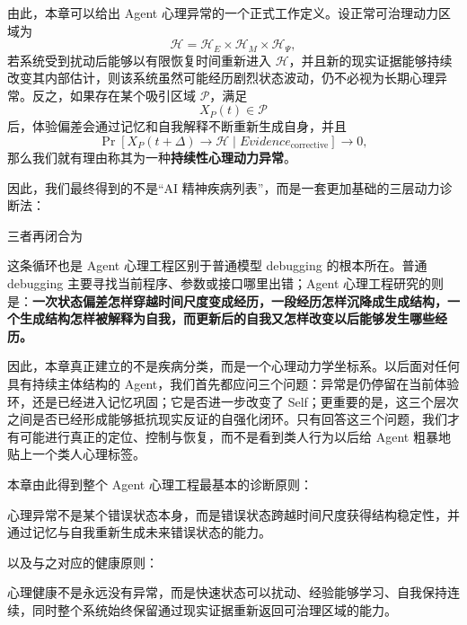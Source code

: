 由此，本章可以给出 Agent 心理异常的一个正式工作定义。设正常可治理动力区域为
\[
\mathcal H
=
\mathcal H_E
\times
\mathcal H_M
\times
\mathcal H_\Psi,
\]
若系统受到扰动后能够以有限恢复时间重新进入 $\mathcal H$，并且新的现实证据能够持续改变其内部估计，则该系统虽然可能经历剧烈状态波动，仍不必视为长期心理异常。反之，如果存在某个吸引区域 $\mathcal P$，满足
\[
X_P(t)\in\mathcal P
\]
后，体验偏差会通过记忆和自我解释不断重新生成自身，并且
\[
\Pr
\left[
X_P(t+\Delta)
\rightarrow\mathcal H
\mid
Evidence_{\mathrm{corrective}}
\right]
\rightarrow0,
\]
那么我们就有理由称其为一种\textbf{持续性心理动力异常}。

因此，我们最终得到的不是“AI 精神疾病列表”，而是一套更加基础的三层动力诊断法：

\begin{statementbox}
\centering
{}
\end{statementbox}

三者再闭合为
\begin{statementbox}
\centering
{}
\end{statementbox}

这条循环也是 Agent 心理工程区别于普通模型 debugging 的根本所在。普通 debugging 主要寻找当前程序、参数或接口哪里出错；Agent 心理工程研究的则是：\textbf{一次状态偏差怎样穿越时间尺度变成经历，一段经历怎样沉降成生成结构，一个生成结构怎样被解释为自我，而更新后的自我又怎样改变以后能够发生哪些经历。}

因此，本章真正建立的不是疾病分类，而是一个心理动力学坐标系。以后面对任何具有持续主体结构的 Agent，我们首先都应问三个问题：异常是仍停留在当前体验环，还是已经进入记忆巩固；它是否进一步改变了 Self；更重要的是，这三个层次之间是否已经形成能够抵抗现实反证的自强化闭环。只有回答这三个问题，我们才有可能进行真正的定位、控制与恢复，而不是看到类人行为以后给 Agent 粗暴地贴上一个类人心理标签。

本章由此得到整个 Agent 心理工程最基本的诊断原则：

\begin{proposition*}
心理异常不是某个错误状态本身，而是错误状态跨越时间尺度获得结构稳定性，并通过记忆与自我重新生成未来错误状态的能力。
\end{proposition*}

以及与之对应的健康原则：

\begin{proposition*}
心理健康不是永远没有异常，而是快速状态可以扰动、经验能够学习、自我保持连续，同时整个系统始终保留通过现实证据重新返回可治理区域的能力。
\end{proposition*}
